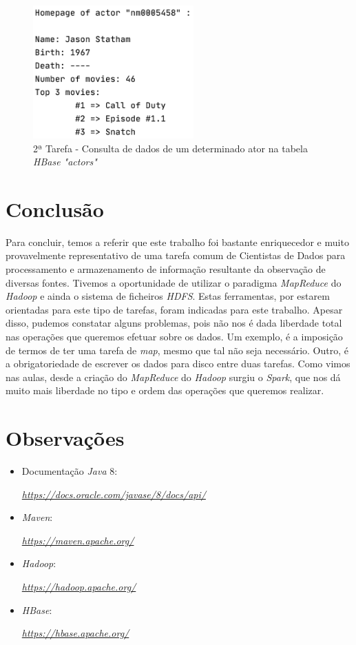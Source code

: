 \documentclass[a4paper]{report}
\begin{document}
{		\begin{figure}[H]
            \centering
            \includegraphics[width=0.55\textwidth]{Imagens/2ª Tarefa - Homepage.png}
            \caption{2ª Tarefa - Consulta de dados de um determinado ator na tabela \textit{HBase "actors"}}
            \label{fig:21}
        \end{figure}
}

\chapter{Conclusão} \label{ch:Conclusion}
\large{
	Para concluir, temos a referir que este trabalho foi bastante enriquecedor e muito provavelmente representativo de uma tarefa comum de Cientistas de Dados para processamento e armazenamento de informação resultante da observação de diversas fontes.
	Tivemos a oportunidade de utilizar o paradigma \textit{MapReduce} do \textit{Hadoop} e ainda o sistema de ficheiros \textit{HDFS}. Estas ferramentas, por estarem orientadas para este tipo de tarefas, foram indicadas para este trabalho. Apesar disso, pudemos constatar alguns problemas, pois não nos é dada liberdade total nas operações que queremos efetuar sobre os dados. Um exemplo, é a imposição de termos de ter uma tarefa de \textit{map}, mesmo que tal não seja necessário. Outro, é a obrigatoriedade de escrever os dados para disco entre duas tarefas.
	Como vimos nas aulas, desde a criação do \textit{MapReduce} do \textit{Hadoop} surgiu o \textit{Spark}, que nos dá muito mais liberdade no tipo e ordem das operações que queremos realizar.
}

\appendix
\chapter{Observações} \label{ch:Observations}
\begin{itemize}
    \item Documentação \textit{Java} 8:
    \par \textit{\url{https://docs.oracle.com/javase/8/docs/api/}}
	\item \textit{Maven}:
    \par \textit{\url{https://maven.apache.org/}}
    \item \textit{Hadoop}:
    \par \textit{\url{https://hadoop.apache.org/}}
    \item \textit{HBase}:
    \par \textit{\url{https://hbase.apache.org/}}
\end{itemize}
\end{document}
